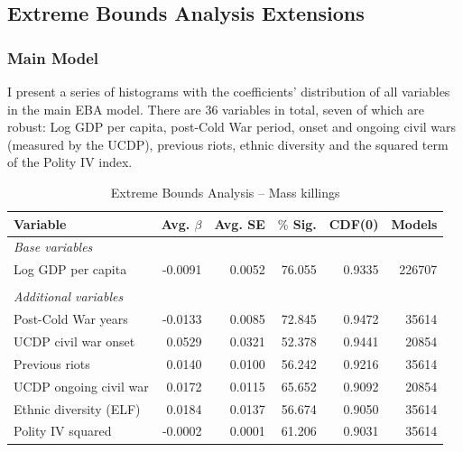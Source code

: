 \newpage

\subsection{Extreme Bounds Analysis Extensions}
\label{sec:mk-ebae}

\subsubsection{Main Model}

I present a series of histograms with the coefficients' distribution of all variables in the main EBA model. There are 36 variables in total, seven of which are robust: Log GDP per capita, post-Cold War period, onset and ongoing civil wars (measured by the UCDP), previous riots, ethnic diversity and the squared term of the Polity IV index.

\vspace{1cm}

\begin{table}[H]
\centering
\begin{tabular}{lrrrrr}
\hline
\textbf{Variable} & \textbf{Avg. $\beta$} & \textbf{Avg. SE} & \textbf{$\%$ Sig.} & \textbf{CDF(0)} & \textbf{Models} \\ \hline
\textit{Base variables} &  &  &  &  &  \\
Log GDP per capita & -0.0091 & 0.0052 & 76.055 & 0.9335 & 226707 \\
 &  &  &  &  &  \\
\textit{Additional variables} &  &  &  &  &  \\
Post-Cold War years & -0.0133 & 0.0085 & 72.845 & 0.9472 & 35614 \\
UCDP civil war onset & 0.0529 & 0.0321 & 52.378 & 0.9441 & 20854 \\
Previous riots & 0.0140 & 0.0100 & 56.242 & 0.9216 & 35614 \\
UCDP ongoing civil war & 0.0172 & 0.0115 & 65.652 & 0.9092 & 20854 \\
Ethnic diversity (ELF) & 0.0184 & 0.0137 & 56.674 & 0.9050 & 35614 \\
Polity IV squared & -0.0002 & 0.0001 & 61.206 & 0.9031 & 35614 \\ \hline
\end{tabular}
\caption{Extreme Bounds Analysis -- Mass killings}
\label{tab:mk}
\end{table}

